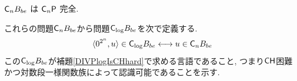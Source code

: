 \begin{lemma} \label{lemma:CnP-complete}
 $\mathsf{C}_n B_{be}$ は $\mathsf{C}_n\mathsf{P}$ 完全.
\end{lemma}

これらの問題$\mathsf{C}_n B_{be}$から問題$\mathsf{C}_{\log} B_{be}$を次で定義する.
\begin{equation}
 \langle 0^{2^n}, u \rangle \in \mathsf{C}_{\log} B_{be}
 \longleftrightarrow
 u \in \mathsf{C}_n B_{be}
\end{equation}
この$\mathsf{C}_{\log} B_{be}$が補題\ref{DIVPlogIsCHhard}で求める言語であること,
つまり$\mathsf{CH}$困難かつ対数段一様関数族によって認識可能であることを示す.


